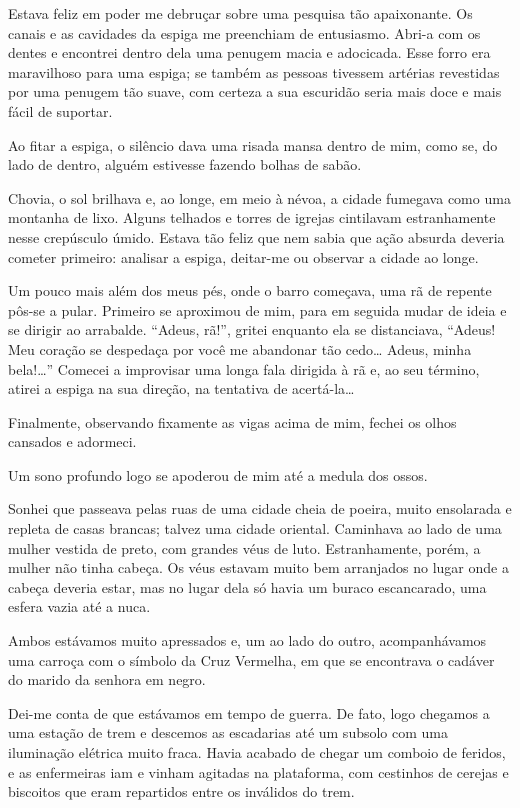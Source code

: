 Estava feliz em poder me debruçar sobre uma pesquisa tão apaixonante. Os canais e as cavidades da espiga me preenchiam de entusiasmo. Abri-a com os dentes e encontrei dentro dela uma penugem macia e adocicada. Esse forro era maravilhoso para uma espiga; se também as pessoas tivessem artérias revestidas por uma penugem tão suave, com certeza a sua escuridão seria mais doce e mais fácil de suportar.

Ao fitar a espiga, o silêncio dava uma risada mansa dentro de mim, como se, do lado de dentro, alguém estivesse fazendo bolhas de sabão.

Chovia, o sol brilhava e, ao longe, em meio à névoa, a cidade fumegava como uma montanha de lixo. Alguns telhados e torres de igrejas cintilavam estranhamente nesse crepúsculo úmido. Estava tão feliz que nem sabia que ação absurda deveria cometer primeiro: analisar a espiga, deitar-me ou observar a cidade ao longe.

Um pouco mais além dos meus pés, onde o barro começava, uma rã de repente pôs-se a pular. Primeiro se aproximou de mim, para em seguida mudar de ideia e se dirigir ao arrabalde. ``Adeus, rã!'', gritei enquanto ela se distanciava, ``Adeus! Meu coração se despedaça por você me abandonar tão cedo\ldots{} Adeus, minha bela!\ldots{}'' Comecei a improvisar uma longa fala dirigida à rã e, ao seu término, atirei a espiga na sua direção, na tentativa de acertá-la\ldots{}

Finalmente, observando fixamente as vigas acima de mim, fechei os olhos cansados e adormeci.

Um sono profundo logo se apoderou de mim até a medula dos ossos.

Sonhei que passeava pelas ruas de uma cidade cheia de poeira, muito ensolarada e repleta de casas brancas; talvez uma cidade oriental. Caminhava ao lado de uma mulher vestida de preto, com grandes véus de luto. Estranhamente, porém, a mulher não tinha cabeça. Os véus estavam muito bem arranjados no lugar onde a cabeça deveria estar, mas no lugar dela só havia um buraco escancarado, uma esfera vazia até a nuca.

Ambos estávamos muito apressados e, um ao lado do outro, acompanhávamos uma carroça com o símbolo da Cruz Vermelha, em que se encontrava o cadáver do marido da senhora em negro.

Dei-me conta de que estávamos em tempo de guerra. De fato, logo chegamos a uma estação de trem e descemos as escadarias até um subsolo com uma iluminação elétrica muito fraca. Havia acabado de chegar um comboio de feridos, e as enfermeiras iam e vinham agitadas na plataforma, com cestinhos de cerejas e biscoitos que eram repartidos entre os inválidos do trem.

